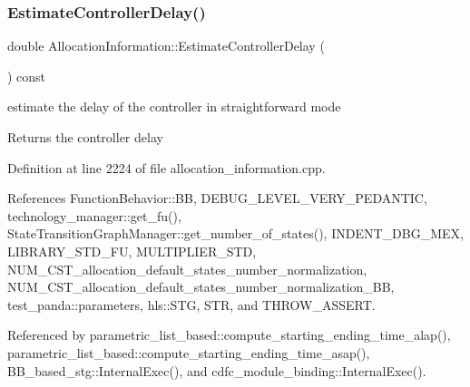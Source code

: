 \subsubsection{\texorpdfstring{Estimate\+Controller\+Delay()}{EstimateControllerDelay()}}
{\footnotesize\ttfamily double Allocation\+Information\+::\+Estimate\+Controller\+Delay (\begin{DoxyParamCaption}{ }\end{DoxyParamCaption}) const}



estimate the delay of the controller in straightforward mode 

\begin{DoxyReturn}{Returns}
the controller delay 
\end{DoxyReturn}


Definition at line 2224 of file allocation\+\_\+information.\+cpp.



References Function\+Behavior\+::\+BB, D\+E\+B\+U\+G\+\_\+\+L\+E\+V\+E\+L\+\_\+\+V\+E\+R\+Y\+\_\+\+P\+E\+D\+A\+N\+T\+IC, technology\+\_\+manager\+::get\+\_\+fu(), State\+Transition\+Graph\+Manager\+::get\+\_\+number\+\_\+of\+\_\+states(), I\+N\+D\+E\+N\+T\+\_\+\+D\+B\+G\+\_\+\+M\+EX, L\+I\+B\+R\+A\+R\+Y\+\_\+\+S\+T\+D\+\_\+\+FU, M\+U\+L\+T\+I\+P\+L\+I\+E\+R\+\_\+\+S\+TD, N\+U\+M\+\_\+\+C\+S\+T\+\_\+allocation\+\_\+default\+\_\+states\+\_\+number\+\_\+normalization, N\+U\+M\+\_\+\+C\+S\+T\+\_\+allocation\+\_\+default\+\_\+states\+\_\+number\+\_\+normalization\+\_\+\+BB, test\+\_\+panda\+::parameters, hls\+::\+S\+TG, S\+TR, and T\+H\+R\+O\+W\+\_\+\+A\+S\+S\+E\+RT.



Referenced by parametric\+\_\+list\+\_\+based\+::compute\+\_\+starting\+\_\+ending\+\_\+time\+\_\+alap(), parametric\+\_\+list\+\_\+based\+::compute\+\_\+starting\+\_\+ending\+\_\+time\+\_\+asap(), B\+B\+\_\+based\+\_\+stg\+::\+Internal\+Exec(), and cdfc\+\_\+module\+\_\+binding\+::\+Internal\+Exec().


